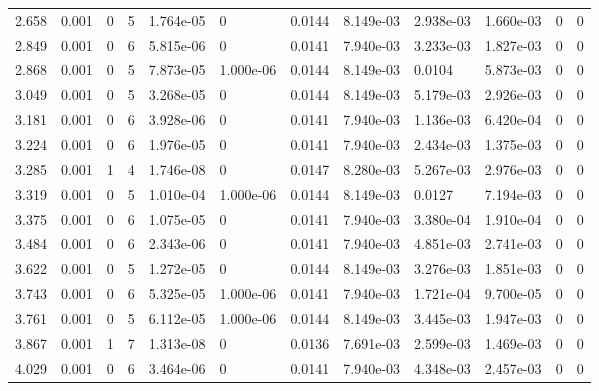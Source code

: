 \documentclass[preview]{standalone}
\begin{document}
{{\begin{tabular}{L{1.2cm}C{1.2cm} C{0.3cm}C{0.5cm} C{1.4cm}C{1.4cm} C{1.4cm}C{1.4cm} C{1.6cm}C{1.6cm} C{1.6cm}C{1.6cm}}
  2.658  &  0.001  & 0     &  5 &  1.764e-05  & 0  &  0.0144&   8.149e-03& 2.938e-03 & 1.660e-03   &  0 & 0  \\ 
  2.849  &  0.001  & 0     &  6 &  5.815e-06  & 0  &  0.0141&   7.940e-03& 3.233e-03 & 1.827e-03   &  0 & 0  \\ 
  2.868  &  0.001  & 0     &  5 &  7.873e-05  & 1.000e-06  &  0.0144&   8.149e-03& 0.0104 & 5.873e-03   &  0 & 0  \\ 
  3.049  &  0.001  & 0     &  5 &  3.268e-05  & 0  &  0.0144&   8.149e-03& 5.179e-03 & 2.926e-03   &  0 & 0  \\ 
  3.181  &  0.001  & 0     &  6 &  3.928e-06  & 0  &  0.0141&   7.940e-03& 1.136e-03 & 6.420e-04   &  0 & 0  \\ 
  3.224  &  0.001  & 0     &  6 &  1.976e-05  & 0  &  0.0141&   7.940e-03& 2.434e-03 & 1.375e-03   &  0 & 0  \\ 
  3.285  &  0.001  & 1     &  4 &  1.746e-08  & 0  &  0.0147&   8.280e-03& 5.267e-03 & 2.976e-03   &  0 & 0  \\ 
  3.319  &  0.001  & 0     &  5 &  1.010e-04  & 1.000e-06  &  0.0144&   8.149e-03& 0.0127 & 7.194e-03   &  0 & 0  \\ 
  3.375  &  0.001  & 0     &  6 &  1.075e-05  & 0  &  0.0141&   7.940e-03& 3.380e-04 & 1.910e-04   &  0 & 0  \\ 
  3.484  &  0.001  & 0     &  6 &  2.343e-06  & 0  &  0.0141&   7.940e-03& 4.851e-03 & 2.741e-03   &  0 & 0  \\ 
  3.622  &  0.001  & 0     &  5 &  1.272e-05  & 0  &  0.0144&   8.149e-03& 3.276e-03 & 1.851e-03   &  0 & 0  \\ 
  3.743  &  0.001  & 0     &  6 &  5.325e-05  & 1.000e-06  &  0.0141&   7.940e-03& 1.721e-04 & 9.700e-05   &  0 & 0  \\ 
  3.761  &  0.001  & 0     &  5 &  6.112e-05  & 1.000e-06  &  0.0144&   8.149e-03& 3.445e-03 & 1.947e-03   &  0 & 0  \\ 
  3.867  &  0.001  & 1     &  7 &  1.313e-08  & 0  &  0.0136&   7.691e-03& 2.599e-03 & 1.469e-03   &  0 & 0  \\ 
  4.029  &  0.001  & 0     &  6 &  3.464e-06  & 0  &  0.0141&   7.940e-03& 4.348e-03 & 2.457e-03   &  0 & 0  \\ 
\hline 
\end{tabular} 

}}
\end{document}
